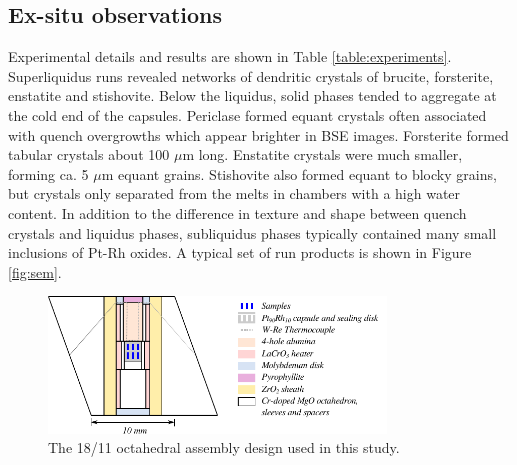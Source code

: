 \documentclass[review]{elsarticle}
\begin{document}
\subsection{Ex-situ observations}
Experimental details and results are shown in Table \ref{table:experiments}. Superliquidus runs revealed networks of dendritic crystals of brucite, forsterite, enstatite and stishovite. Below the liquidus, solid phases tended to aggregate at the cold end of the capsules. Periclase formed equant crystals often associated with quench overgrowths which appear brighter in BSE images. Forsterite formed tabular crystals about 100 $\mu$m long. Enstatite crystals were much smaller, forming ca. 5 $\mu$m equant grains. Stishovite also formed equant to blocky grains, but crystals only separated from the melts in chambers with a high water content. In addition to the difference in texture and shape between quench crystals and liquidus phases, subliquidus phases typically contained many small inclusions of Pt-Rh oxides. A typical set of run products is shown in Figure \ref{fig:sem}.

\begin{figure}[h!]
  \centering
      \includegraphics[width=0.8\textwidth]{figures/assembly}
  \caption{The 18/11 octahedral assembly design used in this study.}
  \label{fig:assembly}
\end{figure}
\end{document}

